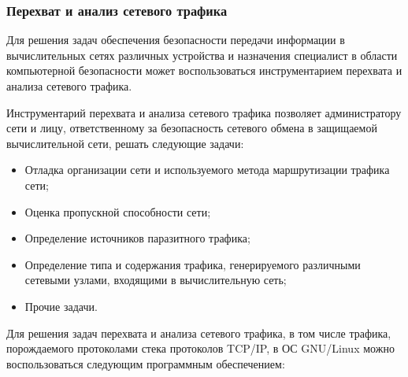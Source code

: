 
\subsubsection{Перехват и анализ сетевого трафика}

	Для решения задач обеспечения безопасности передачи информации в вычислительных сетях различных устройства и
	назначения специалист в области компьютерной безопасности может воспользоваться инструментарием перехвата и
	анализа сетевого трафика.

	Инструментарий перехвата и анализа сетевого трафика позволяет администратору сети и лицу, ответственному за
	безопасность сетевого обмена в защищаемой вычислительной сети, решать следующие задачи:

	\begin{itemize}

		\item Отладка организации сети и используемого метода маршрутизации трафика сети;
		\item Оценка пропускной способности сети;
		\item Определение источников паразитного трафика;
		\item Определение типа и содержания трафика, генерируемого различными сетевыми узлами, входящими в
		вычислительную сеть;
		\item Прочие задачи.

	\end{itemize}

	Для решения задач перехвата и анализа сетевого трафика, в том числе трафика, порождаемого протоколами стека
	протоколов TCP/IP, в ОС GNU/Linux можно воспользоваться следующим программным обеспечением:

